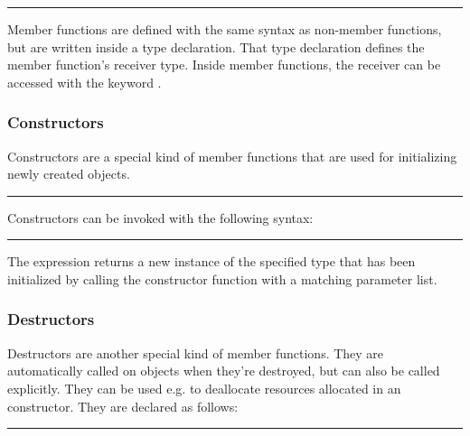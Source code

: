 \begin{grammar}
\rule{member-function-call}    \code{(}  \code{)}
\end{grammar}

Member functions are defined with the same syntax as non-member functions, but
are written inside a type declaration. That type declaration defines the member
function's receiver type. Inside member functions, the receiver can be accessed
with the keyword .

\subsubsection{Constructors}

Constructors are a special kind of member functions that are used for
initializing newly created objects.

\begin{grammar}
\rule{constructor-definition}  \code{(}  \code{)} \code{\{}  \code{\}}
\end{grammar}

Constructors can be invoked with the following syntax:

\begin{grammar}
\rule{constructor-call}  \code{\{}  \code{\}}
\end{grammar}

The  expression returns a new instance of the
specified type that has been initialized by calling the constructor function
with a matching parameter list.

\subsubsection{Destructors}

Destructors are another special kind of member functions. They are
automatically called on objects when they're destroyed, but can also be called
explicitly. They can be used e.g. to deallocate resources allocated in an
constructor. They are declared as follows:

\begin{grammar}
\rule{destructor-definition} \code{\~}  \code{(} \code{)} \code{\{}  \code{\}}
\end{grammar}

